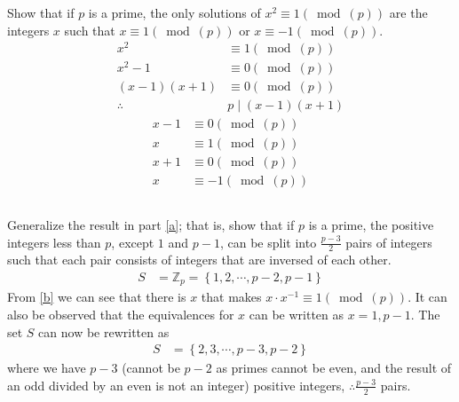 \documentclass{article}
\begin{document}
Show that if $ p $ is a prime, the only solutions of $ x^2 \equiv 1(\bmod(p)) $ are the integers $ x $ such that $ x \equiv 1(\bmod(p)) $ or $ x \equiv -1(\bmod(p)) $.
\begin{align*}
	x^2            & \equiv 1(\bmod(p))    \\
	x^2 - 1        & \equiv 0(\bmod(p))    \\
	(x - 1)(x + 1) & \equiv 0(\bmod(p))    \\
	\therefore{}   & p \mid (x - 1)(x + 1)
\end{align*}
\begin{align*}
	x - 1 & \equiv 0(\bmod(p))  \\
	x     & \equiv 1(\bmod(p))  \\
	x + 1 & \equiv 0(\bmod(p))  \\
	x     & \equiv -1(\bmod(p))
\end{align*}

\subsection{} \label{c}

Generalize the result in part \ref{a}; that is, show that if $ p $ is a prime, the positive integers less than $ p $, except $ 1 $ and $ p - 1 $, can be split into $ \frac{ p - 3 }{ 2 } $ pairs of integers such that each pair consists of integers that are inversed of each other.
\begin{align*}
	S & = \mathbb{Z}_p = \left\{ 1, 2, \cdots, p - 2, p - 1 \right\}
\end{align*}
From \ref{b} we can see that there is $ x $ that makes $ x \cdot x^{-1} \equiv 1(\bmod(p)) $. It can also be observed that the equivalences for $ x $ can be written as $ x = 1, p - 1 $. The set $ S $ can now be rewritten as
\begin{align*}
	S & = \left\{ 2, 3, \cdots, p - 3, p - 2 \right\}
\end{align*}
where we have $ p - 3 $ (cannot be $ p - 2 $ as primes cannot be even, and the result of an odd divided by an even is not an integer) positive integers, $ \therefore{} \frac{ p - 3 }{ 2 } $ pairs.

\subsection{}
\end{document}
